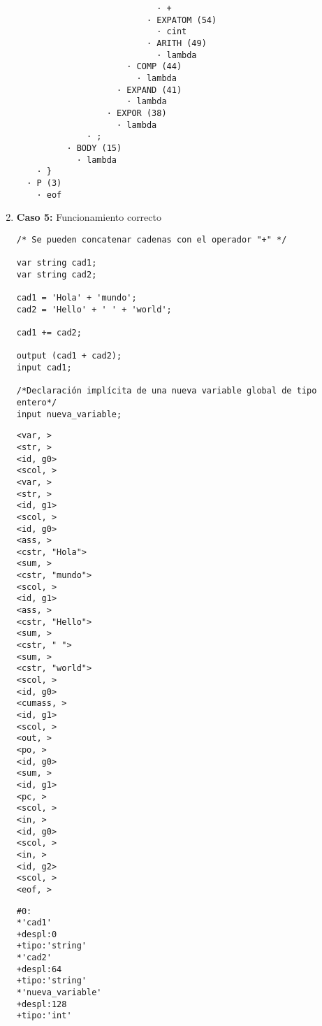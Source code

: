 \begin{enumerate}
\begin{tcolorbox}[title={Árbol sintáctico}, colback=white, breakable]
\begin{lstlisting}
                            · +
                          · EXPATOM (54)
                            · cint
                          · ARITH (49)
                            · lambda
                      · COMP (44)
                        · lambda
                    · EXPAND (41)
                      · lambda
                  · EXPOR (38)
                    · lambda
              · ;
          · BODY (15)
            · lambda
    · }
  · P (3)
    · eof
        \end{lstlisting}
    \end{tcolorbox}





    \item \textbf{Caso 5:} Funcionamiento correcto
    \begin{tcolorbox}[title={Código fuente}, colback=white]
        \begin{lstlisting}
/* Se pueden concatenar cadenas con el operador "+" */

var string cad1;
var string cad2;

cad1 = 'Hola' + 'mundo';
cad2 = 'Hello' + ' ' + 'world';

cad1 += cad2;

output (cad1 + cad2);
input cad1;

/*Declaración implícita de una nueva variable global de tipo entero*/
input nueva_variable;
        \end{lstlisting}
    \end{tcolorbox}

    \begin{tcolorbox}[title={Volcado del fichero de tokens}, colback=white]
        \begin{lstlisting}
<var, >
<str, >
<id, g0>
<scol, >
<var, >
<str, >
<id, g1>
<scol, >
<id, g0>
<ass, >
<cstr, "Hola">
<sum, >
<cstr, "mundo">
<scol, >
<id, g1>
<ass, >
<cstr, "Hello">
<sum, >
<cstr, " ">
<sum, >
<cstr, "world">
<scol, >
<id, g0>
<cumass, >
<id, g1>
<scol, >
<out, >
<po, >
<id, g0>
<sum, >
<id, g1>
<pc, >
<scol, >
<in, >
<id, g0>
<scol, >
<in, >
<id, g2>
<scol, >
<eof, >
        \end{lstlisting}
    \end{tcolorbox}

    \begin{tcolorbox}[title={Volcado del fichero de la tabla de símbolos}, colback=white]
        \begin{lstlisting}
#0:
*'cad1'
+despl:0
+tipo:'string'
*'cad2'
+despl:64
+tipo:'string'
*'nueva_variable'
+despl:128
+tipo:'int'
        \end{lstlisting}
    \end{tcolorbox}


\end{enumerate}
